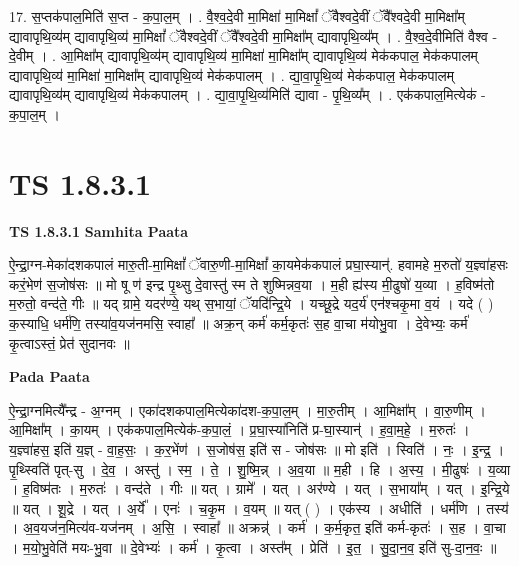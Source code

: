 \documentclass[17pt]{extarticle}
\begin{document}
17. स॒प्तक॑पाल॒मिति॑ स॒प्त - क॒पा॒ल॒म् । . वै॒श्व॒दे॒वी मा॒मिक्षा॑ मा॒मिक्षां᳚ ॅवैश्वदे॒वीं ॅवै᳚श्वदे॒वी मा॒मिक्षा᳚म् द्यावापृथि॒व्य॑म् द्यावापृथि॒व्य॑ मा॒मिक्षां᳚ ॅवैश्वदे॒वीं ॅवै᳚श्वदे॒वी मा॒मिक्षा᳚म् द्यावापृथि॒व्य᳚म् । . वै॒श्व॒दे॒वीमिति॑ वैश्व - दे॒वीम् । . आ॒मिक्षा᳚म् द्यावापृथि॒व्य॑म् द्यावापृथि॒व्य॑ मा॒मिक्षा॑ मा॒मिक्षा᳚म् द्यावापृथि॒व्य॑ मेक॑कपाल॒ मेक॑कपालम् द्यावापृथि॒व्य॑ मा॒मिक्षा॑ मा॒मिक्षा᳚म् द्यावापृथि॒व्य॑ मेक॑कपालम् । . द्या॒वा॒पृ॒थि॒व्य॑ मेक॑कपाल॒ मेक॑कपालम् द्यावापृथि॒व्य॑म् द्यावापृथि॒व्य॑ मेक॑कपालम् । . द्या॒वा॒पृ॒थि॒व्य॑मिति॑ द्यावा - पृ॒थि॒व्य᳚म् । . एक॑कपाल॒मित्येक॑ - क॒पा॒ल॒म् । \newline
\pagebreak
{}

\section{ TS 1.8.3.1 }

\textbf{TS 1.8.3.1 } \newline
\textbf{Samhita Paata} \newline

ऐ॒न्द्रा॒ग्न-मेका॑दशकपालं मारु॒ती-मा॒मिक्षां᳚ ॅवारु॒णी-मा॒मिक्षां᳚ का॒यमेक॑कपालं प्रघा॒स्यान्॑. हवामहे म॒रुतो॑ य॒ज्ञ्वा॑हसः करं॒भेण॑ स॒जोष॑सः ॥ मो षू ण॑ इन्द्र पृ॒थ्सु दे॒वास्तु॑ स्म ते शुष्मिन्नव॒या । म॒ही ह्य॑स्य मी॒ढुषो॑ य॒व्या । ह॒विष्म॑तो म॒रुतो॒ वन्द॑ते॒ गीः ॥ यद् ग्रामे॒ यदर॑ण्ये॒ यथ् स॒भायां॒ ॅयदि॑न्द्रि॒ये । यच्छू॒द्रे यद॒र्य॑ एन॑श्चकृ॒मा व॒यं । यदे ( ) क॒स्याधि॒ धर्म॑णि॒ तस्या॑व॒यज॑नमसि॒ स्वाहा᳚ ॥ अक्र॒न् कर्म॑ कर्म॒कृतः॑ स॒ह वा॒चा म॑योभु॒वा । दे॒वेभ्यः॒ कर्म॑ कृ॒त्वाऽस्तं॒ प्रेत॑ सुदानवः ॥ \newline

\textbf{Pada Paata} \newline

ऐ॒न्द्रा॒ग्नमित्यै᳚न्द्र - अ॒ग्नम् । एका॑दशकपाल॒मित्येका॑दश-क॒पा॒ल॒म् । मा॒रु॒तीम् । आ॒मिक्षा᳚म् । वा॒रु॒णीम् । आ॒मिक्षा᳚म् । का॒यम् । एक॑कपाल॒मित्येक॑-क॒पा॒लं॒ । प्र॒घा॒स्या॑निति॑ प्र-घा॒स्यान्॑ । ह॒वा॒म॒हे॒ । म॒रुतः॑ । य॒ज्ञ्वा॑हस॒ इति॑ य॒ज्ञ् - वा॒ह॒सः॒ । क॒र॒भेंण॑ । स॒जोष॑स॒ इति॑ स - जोष॑सः ॥ मो इति॑ । स्विति॑ । नः॒ । इ॒न्द्र॒ । पृ॒थ्स्विति॑ पृत्-सु । दे॒व॒ । अस्तु॑ । स्म॒ । ते॒ । शु॒ष्मि॒न्न् । अ॒व॒या ॥ म॒ही । हि । अ॒स्य॒ । मी॒ढुषः॑ । य॒व्या । ह॒विष्म॑तः । म॒रुतः॑ । वन्द॑ते । गीः ॥ यत् । ग्रामे᳚ । यत् । अर॑ण्ये । यत् । स॒भाया᳚म् । यत् । इ॒न्द्रि॒ये ॥ यत् । शू॒द्रे । यत् । अ॒र्ये᳚ । एनः॑ । च॒कृ॒म । व॒यम् ॥ यत् ( ) । एक॑स्य । अधीति॑ । धर्म॑णि । तस्य॑ । अ॒व॒यज॑न॒मित्य॑व-यज॑नम् । अ॒सि॒ । स्वाहा᳚ ॥ अक्रन्न्॑ । कर्म॑ । क॒र्म॒कृत॒ इति॑ कर्म-कृतः॑ । स॒ह । वा॒चा । म॒यो॒भु॒वेति॑ मयः-भु॒वा ॥ दे॒वेभ्यः॑ । कर्म॑ । कृ॒त्वा । अस्त᳚म् । प्रेति॑ । इ॒त॒ । सु॒दा॒न॒व॒ इति॑ सु-दा॒न॒वः॒ ॥  \newline
\end{document}
